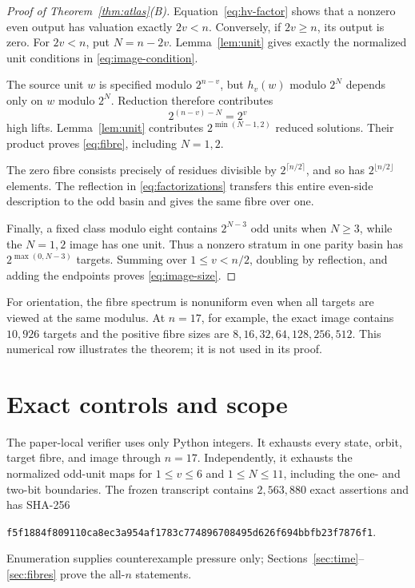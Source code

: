 \documentclass[a4paper,10pt]{amsart}
\theoremstyle{remark}
\begin{document}
\begin{proof}[Proof of Theorem~\ref{thm:atlas}(B)]
Equation~\eqref{eq:hv-factor} shows that a nonzero even output has valuation
exactly $2v<n$.  Conversely, if $2v\geq n$, its output is zero.  For
$2v<n$, put $N=n-2v$.  Lemma~\ref{lem:unit} gives exactly the normalized
unit conditions in \eqref{eq:image-condition}.

The source unit $w$ is specified modulo $2^{n-v}$, but $h_v(w)$ modulo
$2^N$ depends only on $w$ modulo $2^N$.  Reduction therefore contributes
\[
 2^{(n-v)-N}=2^v
\]
high lifts.  Lemma~\ref{lem:unit} contributes
$2^{\min(N-1,2)}$ reduced solutions.  Their product proves
\eqref{eq:fibre}, including $N=1,2$.

The zero fibre consists precisely of residues divisible by
$2^{\lceil n/2\rceil}$, and so has $2^{\lfloor n/2\rfloor}$ elements.
The reflection in \eqref{eq:factorizations} transfers this entire even-side
description to the odd basin and gives the same fibre over one.

Finally, a fixed class modulo eight contains $2^{N-3}$ odd units when
$N\geq3$, while the $N=1,2$ image has one unit.  Thus a nonzero stratum in
one parity basin has $2^{\max(0,N-3)}$ targets.  Summing over
$1\leq v<n/2$, doubling by reflection, and adding the endpoints proves
\eqref{eq:image-size}.
\end{proof}

For orientation, the fibre spectrum is nonuniform even when all targets are
viewed at the same modulus.  At $n=17$, for example, the exact image contains
$10{,}926$ targets and the positive fibre sizes are
$8,16,32,64,128,256,512$.  This numerical row illustrates the theorem; it is
not used in its proof.

\section{Exact controls and scope}\label{sec:controls}

The paper-local verifier uses only Python integers.  It exhausts every state,
orbit, target fibre, and image through $n=17$.  Independently, it exhausts
the normalized odd-unit maps for $1\leq v\leq6$ and $1\leq N\leq11$,
including the one- and two-bit boundaries.  The frozen transcript contains
$2{,}563{,}880$ exact assertions and has SHA-256
\begin{center}
\small\texttt{f5f1884f809110ca8ec3a954af1783c774896708495d626f694bbfb23f7876f1}.
\end{center}
Enumeration supplies counterexample pressure only; Sections~\ref{sec:time}--
\ref{sec:fibres} prove the all-$n$ statements.
\end{document}
